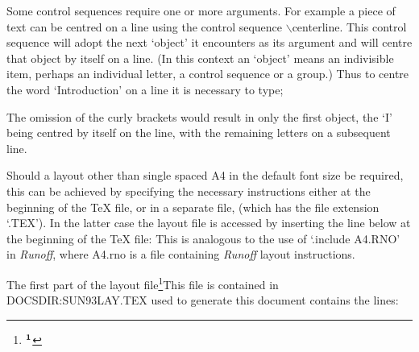 Some control sequences require one or more arguments. For example a 
piece of text can be centred on a line using the control sequence 
$\backslash$centerline. 
This control sequence will adopt the next `object' it encounters as 
its argument and will centre that object  by itself on a line. 
(In this context an `object' means an indivisible item, perhaps an individual 
letter, a control sequence or a group.)
Thus to centre the word `Introduction' on a line it is necessary to
type;
\medskip
{}

The omission of the curly brackets would result in only the first object,
the `I' being centred by itself on the line, with the remaining letters on
a subsequent line.



Should a layout other than single spaced A4 in the default
font size be required,
this can be achieved by specifying the necessary instructions either
at the beginning of the {\TeX} file, or in a separate file, (which has the
file extension `.TEX').
In the latter case the layout file is accessed by inserting the line below
at the beginning of the {\TeX} file:
\medskip
{}
This is analogous to the use of `.include A4.RNO' in {\it Runoff}, where
A4.rno is a file containing {\it Runoff} layout instructions.

The first part of the layout file\footnote{$\bf^1$}{This file is
contained in DOCSDIR:SUN93LAY.TEX} used to generate this document
contains the lines:
\medskip
\tt
{}


